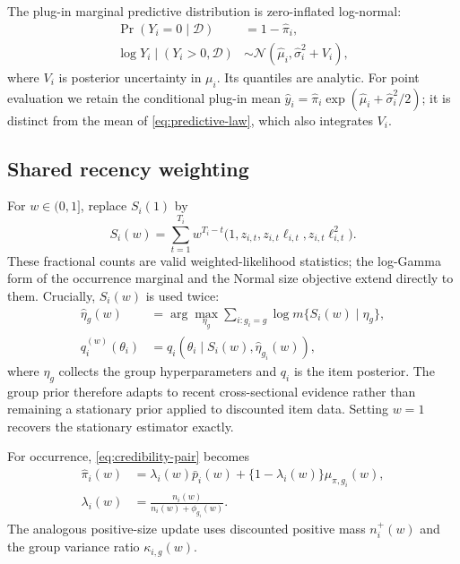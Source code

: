 \documentclass[twocolumn,10pt]{article}
\theoremstyle{definition}
\begin{document}
The plug-in marginal predictive distribution is zero-inflated
log-normal:
\begin{equation}
\begin{aligned}
\Pr(Y_i=0\mid\mathcal D)&=1-\hat\pi_i,\\
\log Y_i\mid(Y_i>0,\mathcal D)
&\sim\mathcal N(\hat\mu_i,\hat\sigma_i^2+V_i),
\end{aligned}
\label{eq:predictive-law}
\end{equation}
where $V_i$ is posterior uncertainty in $\mu_i$. Its quantiles are
analytic. For point evaluation we retain the conditional plug-in mean
$\hat y_i=\hat\pi_i\exp(\hat\mu_i+\hat\sigma_i^2/2)$; it is distinct
from the mean of \eqref{eq:predictive-law}, which also integrates $V_i$.

\subsection{Shared recency weighting}\label{sec:discount}

For $w\in(0,1]$, replace $S_i(1)$ by
\begin{equation}
S_i(w)=\sum_{t=1}^{T_i}w^{T_i-t}
  \bigl(1,z_{i,t},z_{i,t}\ell_{i,t},z_{i,t}\ell_{i,t}^2\bigr).
\label{eq:discounted-stats}
\end{equation}
These fractional counts are valid weighted-likelihood statistics; the
log-Gamma form of the occurrence marginal and the Normal size objective
extend directly to them. Crucially, $S_i(w)$ is used twice:
\begin{equation}
\begin{aligned}
\widehat\eta_g(w)
&=\arg\max_{\eta_g}
  \sum_{i:g_i=g}\log m\{S_i(w)\mid\eta_g\},\\
q_i^{(w)}(\theta_i)
&=q_i\!\left(\theta_i\mid
  S_i(w),\widehat\eta_{g_i}(w)\right),
\end{aligned}
\label{eq:shared-recency}
\end{equation}
where $\eta_g$ collects the group hyperparameters and $q_i$ is the item
posterior. The group prior therefore adapts to recent cross-sectional
evidence rather than remaining a stationary prior applied to discounted
item data. Setting $w=1$ recovers the stationary estimator exactly.

For occurrence, \eqref{eq:credibility-pair} becomes
\begin{equation}
\begin{aligned}
\hat\pi_i(w)
&=\lambda_i(w)\bar p_i(w)
  +\{1-\lambda_i(w)\}\mu_{\pi,g_i}(w),\\
\lambda_i(w)
&=\frac{n_i(w)}{n_i(w)+\phi_{g_i}(w)}.
\end{aligned}
\label{eq:disc-post}
\end{equation}
The analogous positive-size update uses discounted positive mass
$n_i^+(w)$ and the group variance ratio $\kappa_{i,g}(w)$.
\end{document}
